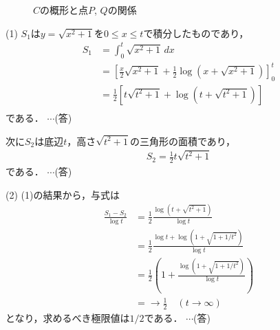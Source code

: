 \documentclass[a4paper,10pt]{ltjsarticle}
\begin{document}
\begin{multicols}{2}
\begin{figure}[H]
    \caption{$C$の概形と点$P$, $Q$の関係}
    \label{fig:1}
  \end{figure}

  \vspace{10pt}
  (1)
  $S_1$は$y=\sqrt{x^2+1}$を$0\le x\le t$で積分したものであり，
  \begin{align*}
    S_1
     & = \int_{0}^{t} \sqrt{x^2+1} \, dx                                                \\
     & = \left[\frac{x}{2}\sqrt{x^2+1} + \frac{1}{2}\log(x+\sqrt{x^2+1})\right]_{0}^{t} \\
     & = \frac{1}{2}\left[t\sqrt{t^2+1} + \log(t+\sqrt{t^2+1})\right]                   \\
  \end{align*}
  である． $\cdots$(答)

  次に$S_2$は底辺$t$，高さ$\sqrt{t^2+1}$の三角形の面積であり，
  \begin{align*}
    S_2 = \frac{1}{2}t\sqrt{t^2+1}
  \end{align*}
  である． $\cdots$(答)

  \vspace{10pt}
  (2)
  (1)の結果から，与式は
  \begin{align*}
    \frac{S_1 - S_2}{\log t}
     & = \frac{1}{2}\frac{\log(t+\sqrt{t^2+1})}{\log t}                   \\
     & = \frac{1}{2}\frac{\log t + \log(1+\sqrt{1+1/t^2})}{\log t}        \\
     & = \frac{1}{2}\left(1+\frac{\log (1+\sqrt{1+1/t^2})}{\log t}\right) \\
     & =\to \frac{1}{2} \quad (t \to \infty)
  \end{align*}
  となり，求めるべき極限値は$1/2$である． $\cdots$(答)



\end{multicols}
\end{document}

